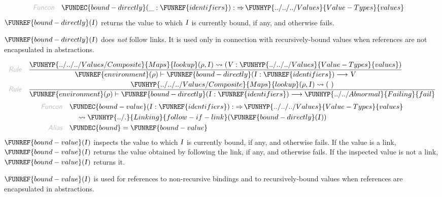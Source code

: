 \begin{align*}
  \KEY{Funcon} \quad
  & \FUNDEC{bound-directly}(
                     \_ : \FUNREF{identifiers}) 
    :  \TO \FUNHYP{../../../Values}{Value-Types}{values} 
\end{align*}
$\FUNREF{bound-directly}
    (  \VAR{I} )$ returns the value to which $\VAR{I}$ is currently bound, if any,
  and otherwise fails.

$\FUNREF{bound-directly}
    (  \VAR{I} )$ does \emph{not} follow links. It is used only in connection with
  recursively-bound values when references are not encapsulated in abstractions.

\begin{align*}
  \KEY{Rule} \quad
    & \frac{
      \FUNHYP{../../../Values/Composite}{Maps}{lookup}
        (  \VAR{\ensuremath{\rho}}, 
               \VAR{I} ) \leadsto 
        (  \VAR{V} : \FUNHYP{../../../Values}{Value-Types}{values} )
      }{
      \FUNREF{environment} (  \VAR{\ensuremath{\rho}} ) \vdash \FUNREF{bound-directly}
                    (  \VAR{I} : \FUNREF{identifiers} ) \TRANS 
        \VAR{V}
      }
\\
  \KEY{Rule} \quad
    & \frac{
      \FUNHYP{../../../Values/Composite}{Maps}{lookup}
        (  \VAR{\ensuremath{\rho}}, 
               \VAR{I} ) \leadsto 
        (   \  )
      }{
      \FUNREF{environment} (  \VAR{\ensuremath{\rho}} ) \vdash \FUNREF{bound-directly}
                    (  \VAR{I} : \FUNREF{identifiers} ) \TRANS 
        \FUNHYP{../../Abnormal}{Failing}{fail}
      }
\end{align*}
\begin{align*}
  \KEY{Funcon} \quad
  & \FUNDEC{bound-value}(
                     \VAR{I} : \FUNREF{identifiers}) 
    :  \TO \FUNHYP{../../../Values}{Value-Types}{values} \\&\quad
    \leadsto \FUNHYP{../.}{Linking}{follow-if-link}
               (  \FUNREF{bound-directly}
                       (  \VAR{I} ) )
\\
  \KEY{Alias} \quad
  & \FUNDEC{bound} = \FUNREF{bound-value}
\end{align*}
$\FUNREF{bound-value}
    (  \VAR{I} )$ inspects the value to which $\VAR{I}$ is currently bound, if any,
   and otherwise fails. If the value is a link, $\FUNREF{bound-value}
    (  \VAR{I} )$ returns the
   value obtained by following the link, if any, and otherwise fails. If the 
   inspected value is not a link, $\FUNREF{bound-value}
    (  \VAR{I} )$ returns it.

$\FUNREF{bound-value}
    (  \VAR{I} )$ is used for references to non-recursive bindings and to
   recursively-bound values when references are encapsulated in abstractions.

